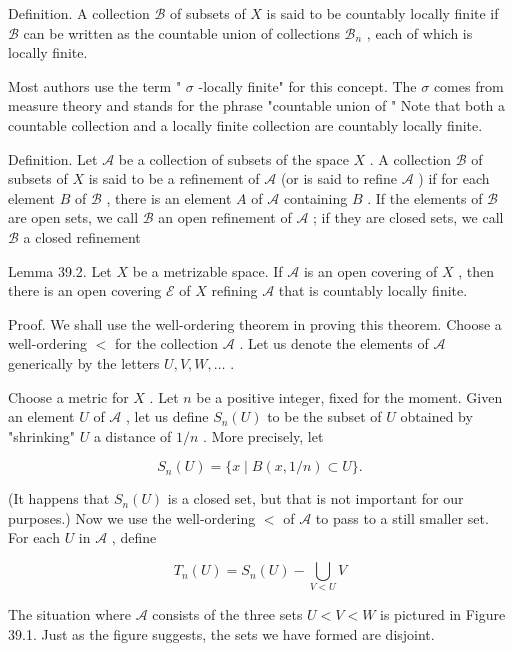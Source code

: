 Definition. A collection \(\mathcal{B}\) of subsets of \(X\) is said to be countably locally finite if \(\mathcal{B}\) can be written as the countable union of collections \({\mathcal{B}}_{n}\) , each of which is locally finite.

Most authors use the term " \(\sigma\) -locally finite" for this concept. The \(\sigma\) comes from measure theory and stands for the phrase "countable union of " Note that both a countable collection and a locally finite collection are countably locally finite.

Definition. Let \(\mathcal{A}\) be a collection of subsets of the space \(X\) . A collection \(\mathcal{B}\) of subsets of \(X\) is said to be a refinement of \(\mathcal{A}\) (or is said to refine \(\mathcal{A}\) ) if for each element \(B\) of \(\mathcal{B}\) , there is an element \(A\) of \(\mathcal{A}\) containing \(B\) . If the elements of \(\mathcal{B}\) are open sets, we call \(\mathcal{B}\) an open refinement of \(\mathcal{A}\) ; if they are closed sets, we call \(\mathcal{B}\) a closed refinement

Lemma 39.2. Let \(X\) be a metrizable space. If \(\mathcal{A}\) is an open covering of \(X\) , then there is an open covering \(\mathcal{E}\) of \(X\) refining \(\mathcal{A}\) that is countably locally finite.

Proof. We shall use the well-ordering theorem in proving this theorem. Choose a well-ordering \(<\) for the collection \(\mathcal{A}\) . Let us denote the elements of \(\mathcal{A}\) generically by the letters \(U,V,W,\ldots\) .

Choose a metric for \(X\) . Let \(n\) be a positive integer, fixed for the moment. Given an element \(U\) of \(\mathcal{A}\) , let us define \({S}_{n}\left( U\right)\) to be the subset of \(U\) obtained by "shrinking" \(U\) a distance of \(1/n\) . More precisely, let

\[
{S}_{n}\left( U\right)  = \{ x \mid  B\left( {x,1/n}\right)  \subset  U\} .
\]

(It happens that \({S}_{n}\left( U\right)\) is a closed set, but that is not important for our purposes.) Now we use the well-ordering \(<\) of \(\mathcal{A}\) to pass to a still smaller set. For each \(U\) in \(\mathcal{A}\) , define

\[
{T}_{n}\left( U\right)  = {S}_{n}\left( U\right)  - \mathop{\bigcup }\limits_{{V < U}}V
\]

The situation where \(\mathcal{A}\) consists of the three sets \(U < V < W\) is pictured in Figure 39.1. Just as the figure suggests, the sets we have formed are disjoint.

